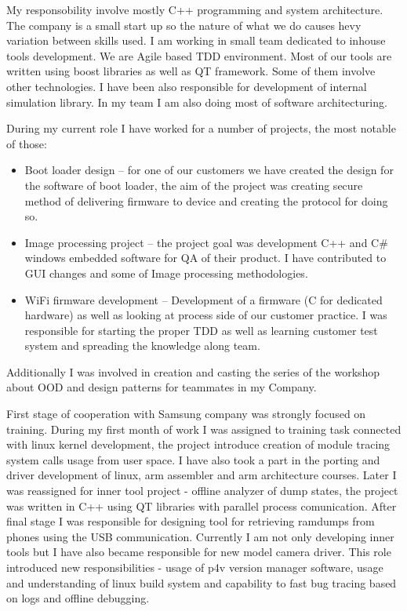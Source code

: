 \documentclass[8pt,a4paper]{moderncv}
\begin{document}
\vspace{4mm}
My responsobility involve mostly C++ programming and system architecture. 
The company is a small start up so the nature of what we do causes hevy variation between skills used.
I am working in small team dedicated to inhouse tools development. We are Agile based TDD environment.
Most of our tools are written using boost libraries as well as QT framework. Some of them involve other technologies.
I have been also responsible for development of internal simulation library. In my team I am also doing most of software architecturing.
\cvline{}{}

\vspace{4mm}
During my current role I have worked for a number of projects, the most notable of those:
\begin{itemize}
\item Boot loader design – for one of our customers we have created the design for the software of boot loader, the aim of the project was creating secure method of delivering firmware to device and creating the protocol for doing so.
\item Image processing project – the project goal was development C++ and C\# windows embedded software for QA of their product. I have contributed to GUI changes and some of Image processing methodologies.
\item WiFi firmware development – Development of a firmware (C for dedicated hardware) as well as looking at process side of our customer practice. I was responsible for starting the proper TDD as well as learning customer test system and spreading the knowledge along team.
\end{itemize}
Additionally I was involved in creation and casting the series of the workshop about OOD and design patterns for teammates in my Company.
\cvline{}{}

\vspace{4mm}
First stage of cooperation with Samsung company was strongly focused on training. During my first month of work I was assigned
to training task connected with linux kernel development, the project introduce creation of module tracing system calls usage from user space.
I have also took a part in the porting and driver development of linux, arm assembler and arm architecture courses.
Later I was reassigned for inner tool project - offline analyzer of dump states, the project was written in C++ using QT libraries
with parallel process comunication. After final stage I was responsible for designing tool for retrieving ramdumps from phones using
the USB communication. Currently I am not only developing inner tools but I have also became responsible for new model camera driver.
This role introduced new responsibilities - usage of p4v version manager software, usage and understanding of linux build system and
capability to fast bug tracing based on logs and offline debugging.
\cvline{}{}
\end{document}
